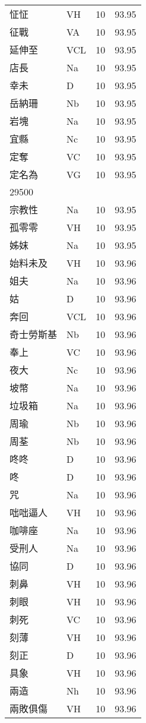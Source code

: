 \documentclass[twocolumn]{book}
\begin{document}
\begin{supertabular}{llrr}
怔怔 & VH & 10 &  93.95\\
征戰 & VA & 10 &  93.95\\
延伸至 & VCL & 10 &  93.95\\
店長 & Na & 10 &  93.95\\
幸未 & D & 10 &  93.95\\
岳納珊 & Nb & 10 &  93.95\\
岩塊 & Na & 10 &  93.95\\
宜縣 & Nc & 10 &  93.95\\
定奪 & VC & 10 &  93.95\\
定名為 & VG & 10 &  93.95\\
29500\\
宗教性 & Na & 10 &  93.95\\
孤零零 & VH & 10 &  93.95\\
姊妺 & Na & 10 &  93.95\\
始料未及 & VH & 10 &  93.96\\
姐夫 & Na & 10 &  93.96\\
姑 & D & 10 &  93.96\\
奔回 & VCL & 10 &  93.96\\
奇士勞斯基 & Nb & 10 &  93.96\\
奉上 & VC & 10 &  93.96\\
夜大 & Nc & 10 &  93.96\\
坡幣 & Na & 10 &  93.96\\
垃圾箱 & Na & 10 &  93.96\\
周瑜 & Nb & 10 &  93.96\\
周荃 & Nb & 10 &  93.96\\
咚咚 & D & 10 &  93.96\\
咚 & D & 10 &  93.96\\
咒 & Na & 10 &  93.96\\
咄咄逼人 & VH & 10 &  93.96\\
咖啡座 & Na & 10 &  93.96\\
受刑人 & Na & 10 &  93.96\\
協同 & D & 10 &  93.96\\
刺鼻 & VH & 10 &  93.96\\
刺眼 & VH & 10 &  93.96\\
刺死 & VC & 10 &  93.96\\
刻薄 & VH & 10 &  93.96\\
刻正 & D & 10 &  93.96\\
具象 & VH & 10 &  93.96\\
兩造 & Nh & 10 &  93.96\\
兩敗俱傷 & VH & 10 &  93.96\\

\end{supertabular}
\end{document}
